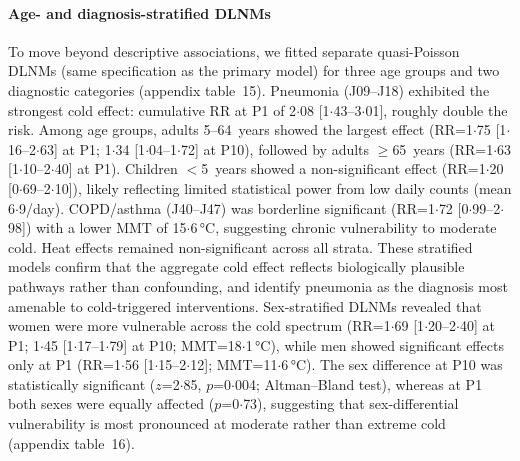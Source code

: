 \documentclass[review,number]{elsarticle}
\begin{document}
\paragraph{Age- and diagnosis-stratified DLNMs}
To move beyond descriptive associations, we fitted separate quasi-Poisson
DLNMs (same specification as the primary model) for three age groups and
two diagnostic categories (appendix table~15). Pneumonia (J09--J18)
exhibited the strongest cold effect: cumulative RR at P1 of
2${\cdot}$08 [1${\cdot}$43--3${\cdot}$01], roughly double the risk.
Among age groups, adults 5--64~years showed the largest effect
(RR=1${\cdot}$75 [1${\cdot}$16--2${\cdot}$63] at P1;
1${\cdot}$34 [1${\cdot}$04--1${\cdot}$72] at P10), followed by
adults $\geq$65~years (RR=1${\cdot}$63 [1${\cdot}$10--2${\cdot}$40]
at P1). Children $<$5~years showed a non-significant effect
(RR=1${\cdot}$20 [0${\cdot}$69--2${\cdot}$10]), likely reflecting
limited statistical power from low daily counts (mean
6${\cdot}$9/day). COPD/asthma (J40--J47) was borderline significant
(RR=1${\cdot}$72 [0${\cdot}$99--2${\cdot}$98]) with a lower MMT of
15${\cdot}$6\,°C, suggesting chronic vulnerability to moderate cold.
Heat effects remained non-significant across all strata. These
stratified models confirm that the aggregate cold effect reflects
biologically plausible pathways rather than confounding, and identify
pneumonia as the diagnosis most amenable to cold-triggered
interventions. Sex-stratified DLNMs revealed that women were
more vulnerable across the cold spectrum (RR=1${\cdot}$69
[1${\cdot}$20--2${\cdot}$40] at P1; 1${\cdot}$45
[1${\cdot}$17--1${\cdot}$79] at P10; MMT=18${\cdot}$1\,°C), while
men showed significant effects only at P1 (RR=1${\cdot}$56
[1${\cdot}$15--2${\cdot}$12]; MMT=11${\cdot}$6\,°C). The
sex difference at P10 was statistically significant
($z$=2${\cdot}$85, $p$=0${\cdot}$004; Altman--Bland
test\cite{Altman2003}), whereas at P1 both sexes were equally
affected ($p$=0${\cdot}$73), suggesting that sex-differential
vulnerability is most pronounced at moderate rather than extreme cold
(appendix table~16).
\end{document}

